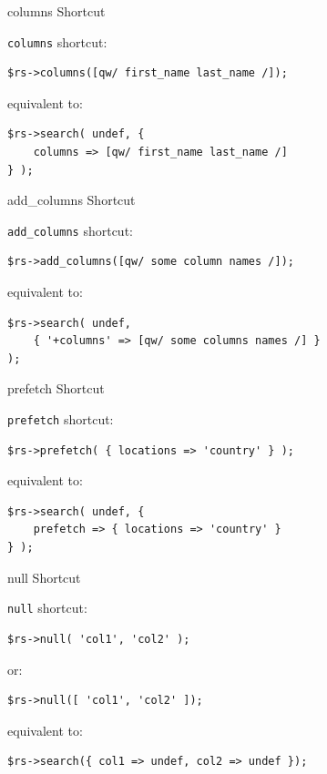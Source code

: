 \begin{frame}[fragile]{columns Shortcut}

\verb|columns| shortcut:

\begin{lstlisting}
$rs->columns([qw/ first_name last_name /]);
\end{lstlisting}

equivalent to:

\begin{lstlisting}
$rs->search( undef, { 
    columns => [qw/ first_name last_name /] 
} );
\end{lstlisting}

\end{frame}

\begin{frame}[fragile]{add\_columns Shortcut}

\verb|add_columns| shortcut:

\begin{lstlisting}
$rs->add_columns([qw/ some column names /]);
\end{lstlisting}

equivalent to:

\begin{lstlisting}
$rs->search( undef,
    { '+columns' => [qw/ some columns names /] }
);
\end{lstlisting}
\end{frame}

\begin{frame}[fragile]{prefetch Shortcut}

\verb|prefetch| shortcut:

\begin{lstlisting}
$rs->prefetch( { locations => 'country' } );
\end{lstlisting}

equivalent to:

\begin{lstlisting}
$rs->search( undef, { 
    prefetch => { locations => 'country' } 
} );
\end{lstlisting}

\end{frame}


\begin{frame}[fragile]{null Shortcut}

\verb|null| shortcut:

\begin{lstlisting}
$rs->null( 'col1', 'col2' );
\end{lstlisting}

or:

\begin{lstlisting}
$rs->null([ 'col1', 'col2' ]);
\end{lstlisting}

equivalent to:

\begin{lstlisting}
$rs->search({ col1 => undef, col2 => undef });
\end{lstlisting}
\end{frame}

